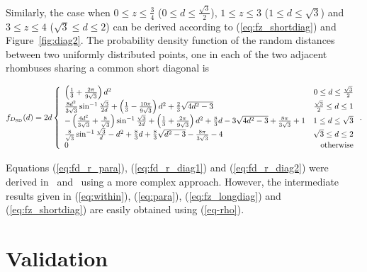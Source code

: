\documentclass[12pt,draftclsnofoot,onecolumn]{IEEEtran}
\begin{document}
Similarly, the case when $0 \leq z \leq \frac{3}{4}$ ($0\leq d\leq 
\frac{\sqrt{3}}{2}$), $1 \leq z \leq 3$ ($1\leq d\leq \sqrt{3}$) and 
$3 \leq z \leq 4$ ($\sqrt{3}\leq d\leq 2$) can
be derived according to (\ref{eq:fz_shortdiag}) and Figure~\ref{fig:diag2}. 
The probability density function of the random distances between two uniformly
distributed points, one in each of the two adjacent rhombuses sharing a common
short diagonal is
\begin{small}
\begin{equation}\label{eq:fd_r_diag2}
  f_{D_{\rm SD}}(d)=2d\left\{
    \begin{array}{lr}

\left(\frac{1}{3}+\frac{2\pi}{9\sqrt{3}}\right)d^2 & 0\leq d\leq
\frac{\sqrt{3}}{2}\\

\frac{8d^2}{3\sqrt{3}}\sin^{-1}\frac{\sqrt{3}}{2d}+\left(\frac{1}{3}-\frac{10\pi
}{9\sqrt{3}}\right)d^2+\frac{2}{3}\sqrt{4d^2-3} & \frac{\sqrt{3}}{2} \leq d \leq
1\\

-\left(\frac{4d^2}{3\sqrt{3}}+\frac{8}{\sqrt{3}}\right)\sin^{-1}\frac{\sqrt{3}}{
2d}+\left(\frac{1}{3}+\frac{2\pi}{9\sqrt{3}}\right)d^2+\frac{8}{3}d-3\sqrt{
4d^2-3}+\frac{8\pi}{3\sqrt{3}}+1 & 1\leq d\leq \sqrt{3} \\

\frac{8}{\sqrt{3}}\sin^{-1}\frac{\sqrt{3}}{d}-d^2+\frac{8}{3}d+\frac{8}{3}\sqrt{
d^2-3}-\frac{8\pi}{3\sqrt{3}}-4 & \sqrt{3}\leq d\leq 2 \\

      0 & {\rm otherwise}
    \end{array}
  \right..
\end{equation}
\end{small}

Equations (\ref{eq:fd_r_para}), (\ref{eq:fd_r_diag1}) and
(\ref{eq:fd_r_diag2}) were derived in~\cite{zhuang2011random}
and~\cite{zhuang2012geometrical} using a more complex approach.
However, the intermediate results given in (\ref{eq:within}), (\ref{eq:para}),
(\ref{eq:fz_longdiag}) and (\ref{eq:fz_shortdiag}) are easily obtained using (\ref{eq-rho}).

\section{Validation}
\end{document}

